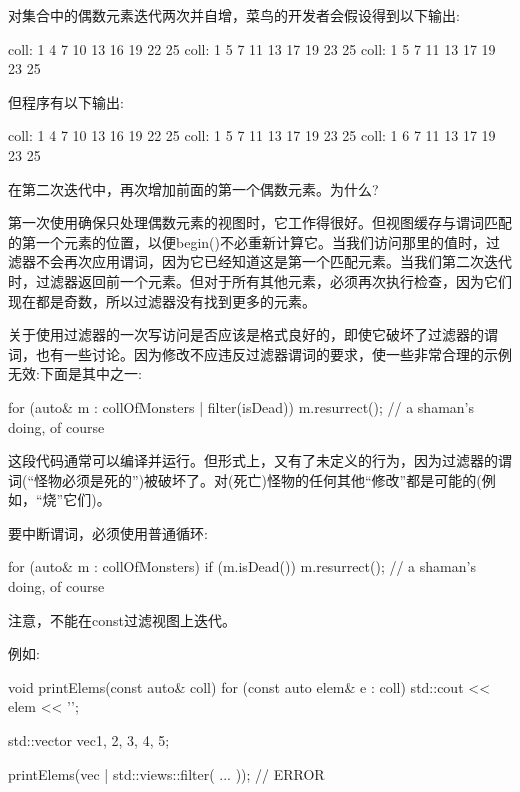 对集合中的偶数元素迭代两次并自增，菜鸟的开发者会假设得到以下输出:

\begin{shell}
coll: 1 4 7 10 13 16 19 22 25
coll: 1 5 7 11 13 17 19 23 25
coll: 1 5 7 11 13 17 19 23 25
\end{shell}

但程序有以下输出:

\begin{shell}
coll: 1 4 7 10 13 16 19 22 25
coll: 1 5 7 11 13 17 19 23 25
coll: 1 6 7 11 13 17 19 23 25
\end{shell}

在第二次迭代中，再次增加前面的第一个偶数元素。为什么?

第一次使用确保只处理偶数元素的视图时，它工作得很好。但视图缓存与谓词匹配的第一个元素的位置，以便begin()不必重新计算它。当我们访问那里的值时，过滤器不会再次应用谓词，因为它已经知道这是第一个匹配元素。当我们第二次迭代时，过滤器返回前一个元素。但对于所有其他元素，必须再次执行检查，因为它们现在都是奇数，所以过滤器没有找到更多的元素。

关于使用过滤器的一次写访问是否应该是格式良好的，即使它破坏了过滤器的谓词，也有一些讨论。因为修改不应违反过滤器谓词的要求，使一些非常合理的示例无效:下面是其中之一:

\begin{cpp}
for (auto& m : collOfMonsters | filter(isDead)) {
	m.resurrect(); // a shaman’s doing, of course
}
\end{cpp}

这段代码通常可以编译并运行。但形式上，又有了未定义的行为，因为过滤器的谓词(“怪物必须是死的”)被破坏了。对(死亡)怪物的任何其他“修改”都是可能的(例如，“烧”它们)。

要中断谓词，必须使用普通循环:

\begin{cpp}
for (auto& m : collOfMonsters) {
	if (m.isDead()) {
		m.resurrect(); // a shaman’s doing, of course
	}
}
\end{cpp}


注意，不能在const过滤视图上迭代。

例如:

\begin{cpp}
void printElems(const auto& coll) {
	for (const auto elem& e : coll) {
		std::cout << elem << '\n';
	}
}

std::vector vec{1, 2, 3, 4, 5};

printElems(vec | std::views::filter( ... )); // ERROR
\end{cpp}

